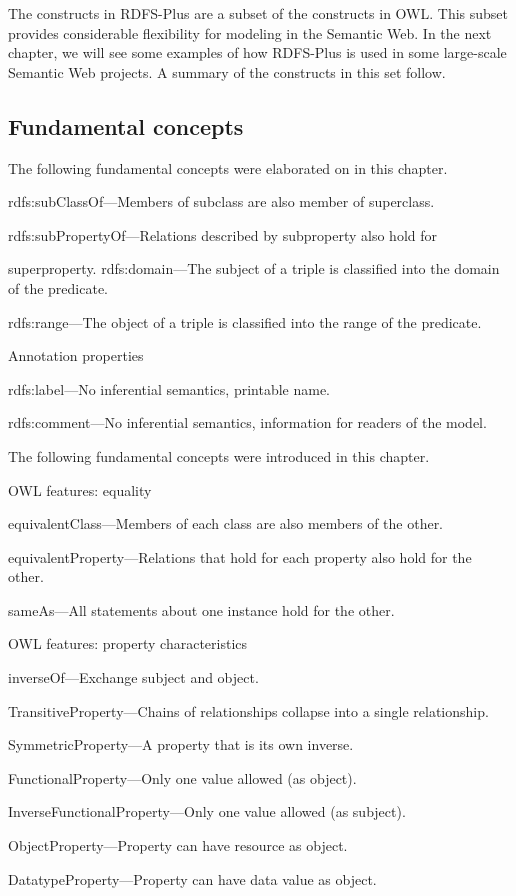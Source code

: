 The constructs in RDFS-Plus are a subset of the constructs in OWL. This
subset provides considerable flexibility for modeling in the Semantic
Web. In the next chapter, we will see some examples of how RDFS-Plus is
used in some large-scale Semantic Web projects. A summary of the
constructs in this set follow.

\subsection{Fundamental concepts}

The following fundamental concepts were elaborated on in this chapter.

rdfs:subClassOf---Members of subclass are also member of superclass.

rdfs:subPropertyOf---Relations described by subproperty also hold for

superproperty. rdfs:domain---The subject of a triple is classified into
the domain of the predicate. 

rdfs:range---The object of a triple is
classified into the range of the predicate.

Annotation properties

rdfs:label---No inferential semantics, printable name.

rdfs:comment---No inferential semantics, information for readers of the
model.

The following fundamental concepts were introduced in this chapter.


OWL features: equality

equivalentClass---Members of each class are also members of the other.

equivalentProperty---Relations that hold for each property also hold for
the other. 

sameAs---All statements about one instance hold for the
other.

OWL features: property characteristics

inverseOf---Exchange subject and object.

TransitiveProperty---Chains of relationships collapse into a single
relationship.

SymmetricProperty---A property that is its own inverse.

FunctionalProperty---Only one value allowed (as object).

InverseFunctionalProperty---Only one value allowed (as subject).

ObjectProperty---Property can have resource as object.

DatatypeProperty---Property can have data value as object.

